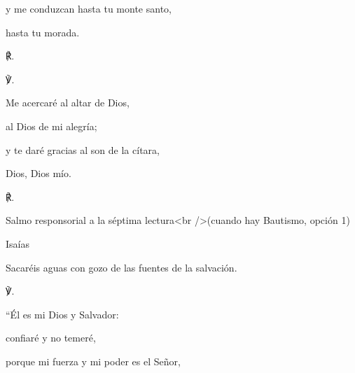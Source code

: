 			\begin{readtabbed}y me conduzcan hasta tu monte santo, \end{readtabbed}
			
			\begin{readtabbed}hasta tu morada. \begin{readred}℟.\end{readred}\end{readtabbed}
			
			\begin{readbody}\begin{readred}℣.\end{readred} Me acercaré al altar de Dios, \end{readbody}
			
			\begin{readtabbed}al Dios de mi alegría; \end{readtabbed}
			
			\begin{readtabbed}y te daré gracias al son de la cítara, \end{readtabbed}
			
			\begin{readtabbed}Dios, Dios mío. \begin{readred}℟.\end{readred}\end{readtabbed}
			
			\begin{readbook}Salmo responsorial a la séptima lectura<br />(cuando hay Bautismo, opción 1)\end{readbook}
			
			\begin{readbook}Isaías  \end{readbook}
			
			\begin{readtheme}Sacaréis aguas con gozo de las fuentes de la salvación.\end{readtheme}
			
			\begin{readbody}\begin{readred}℣.\end{readred} “Él es mi Dios y Salvador:\end{readbody}
			
			\begin{readtabbed}confiaré y no temeré,\end{readtabbed}
			
			\begin{readtabbed}porque mi fuerza y mi poder es el Señor,\end{readtabbed}
			
